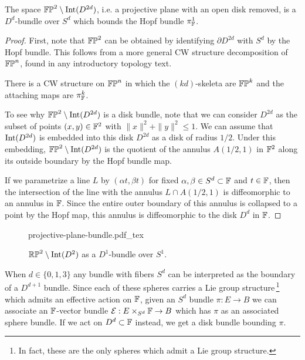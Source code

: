 \begin{proposition}\label{prop:boundary-of-hopf-bundle}
	The space $\mathbb{FP}^2\setminus \operatorname{Int}(D^{2d})$, i.e. a projective plane with an open disk removed, is a $D^d$-bundle over $S^d$ which bounds the Hopf bundle $\pi_{\mathbb{F}}^1$.
\end{proposition}
\begin{proof}
	First, note that $\mathbb{FP}^2$ can be obtained by identifying $\partial D^{2d}$ with $S^d$ by the Hopf bundle. This follows from a more general CW structure decomposition of $\mathbb{FP}^n$, found in any introductory topology text.
	\begin{lemma}
		There is a CW structure on $\mathbb{FP}^n$ in which the $(kd)$-skeleta are $\mathbb{FP}^k$ and the attaching maps are $\pi_{\mathbb{F}}^k$.
	\end{lemma}

	To see why $\mathbb{FP}^2\setminus \operatorname{Int}(D^{2d})$ is a disk bundle, note that we can consider $D^{2d}$ as the subset of points $(x,y)\in \mathbb{F}^2$ with $\|x\|^2+\|y\|^2\leq 1$. We can assume that $\operatorname{Int}(D^{2d})$ is embedded into this disk $D^{2d}$ as a disk of radius $1/2$. Under this embedding, $\mathbb{FP}^2\setminus \operatorname{Int}(D^{2d})$ is the quotient of the annulus $A(1/2,1)$ in $\mathbb{F}^2$ along its outside boundary by the Hopf bundle map.

	If we parametrize a line $L$ by $(\alpha t, \beta t)$ for fixed $\alpha,\beta\in S^d\subset \mathbb{F}$ and $t\in \mathbb{F}$, then the intersection of the line with the annulus $L\cap A(1/2,1)$ is diffeomorphic to an annulus in $\mathbb{F}$. Since the entire outer boundary of this annulus is collapsed to a point by the Hopf map, this annulus is diffeomorphic to the disk $D^d$ in $\mathbb{F}$.
\end{proof}

\begin{figure}[ht]
	\centering
	{projective-plane-bundle.pdf_tex}
	\caption{$\mathbb{RP}^2\setminus \operatorname{Int}(D^2)$ as a $D^1$-bundle over $S^1$.}\label{fig:mobius-bundle-and-hopf-bundle}
\end{figure}

\begin{remark*}\label{rmk:lie-group-structure-Sd}
	When $d\in \{0,1,3\}$ any bundle with fibers $S^d$ can be interpreted as the boundary of a $D^{d+1}$ bundle. Since each of these spheres carries a Lie group structure\,\footnote{In fact, these are the only spheres which admit a Lie group structure.} which admits an effective action on $\mathbb{F}$, given an $S^d$ bundle $\pi : E \to B$ we can associate an $\mathbb{F}$-vector bundle $\mathcal{E} : E\times_{S^d} \mathbb{F} \to B$ which has $\pi$ as an associated sphere bundle. If we act on $D^d\subset \mathbb{F}$ instead, we get a disk bundle bounding $\pi$.
\end{remark*}

